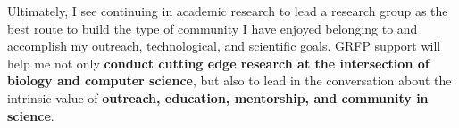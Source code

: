 Ultimately, I see continuing in academic research to lead a research group as the best route to build the type of community I have enjoyed belonging to and accomplish my outreach, technological, and scientific goals.
GRFP support will help me not only \textbf{conduct cutting edge research at the intersection of biology and computer science}, but also to lead in the conversation about the intrinsic value of \textbf{outreach, education, mentorship, and community in science}.
